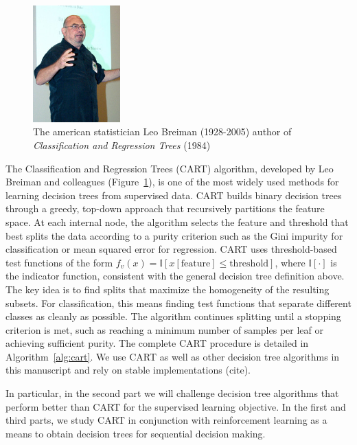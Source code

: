 \begin{figure}
    \centering
    \includegraphics[width=0.3\textwidth]{images/images_intro/Leo_Breiman.jpg}
    \caption{The american statistician Leo Breiman (1928-2005) author of \textit{Classification and Regression Trees} (1984)}
    \label{fig:leo-breiman}
\end{figure}

The Classification and Regression Trees (CART) algorithm, developed by Leo Breiman and colleagues (Figure~\ref{fig:leo-breiman}), is one of the most widely used methods for learning decision trees from supervised data.
CART builds binary decision trees through a greedy, top-down approach that recursively partitions the feature space. 
At each internal node, the algorithm selects the feature and threshold that best splits the data according to a purity criterion such as the Gini impurity for classification or mean squared error for regression.
CART uses threshold-based test functions of the form $f_v(x) = \mathbb{I}[x[\text{feature}] \leq \text{threshold}]$, where $\mathbb{I}[\cdot]$ is the indicator function, consistent with the general decision tree definition above. 
The key idea is to find splits that maximize the homogeneity of the resulting subsets. For classification, this means finding test functions that separate different classes as cleanly as possible. The algorithm continues splitting until a stopping criterion is met, such as reaching a minimum number of samples per leaf or achieving sufficient purity. The complete CART procedure is detailed in Algorithm~\ref{alg:cart}.
We use CART as well as other decision tree algorithms in this manuscript and rely on stable implementations (cite).

In particular, in the second part we will challenge decision tree algorithms that perform better than CART for the supervised learning objective.
In the first and third parts, we study CART in conjunction with reinforcement learning as a means to obtain decision trees for sequential decision making.

